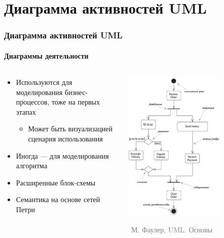 \documentclass[xetex,mathserif,serif]{beamer}
\newcommand{\attribution}[1] {
    \vspace{-5mm}\begin{flushright}\begin{scriptsize}\textcolor{gray}{\textcopyright\, #1}\end{scriptsize}\end{flushright}
}
\begin{document}
    \section{Диаграмма активностей UML}

    \begin{frame}
        \frametitle{Диаграмма активностей UML}
        \framesubtitle{Диаграммы деятельности}
        \begin{columns}
            \begin{column}{0.5\textwidth}
                \begin{itemize}
                    \item Используются для моделирования бизнес-процессов, тоже на первых этапах
                    \begin{itemize}
                        \item Может быть визуализацией сценария использования
                    \end{itemize}
                    \item Иногда --- для моделирования алгоритма
                    \item Расширенные блок-схемы
                    \item Семантика на основе сетей Петри
                \end{itemize}
            \end{column}
            \begin{column}{0.5\textwidth}
                \begin{center}
                    \includegraphics[width=0.7\textwidth]{activityDiagram.png}
                    \attribution{М. Фаулер, UML. Основы}
                \end{center}
            \end{column}
        \end{columns}
    \end{frame}
\end{document}
